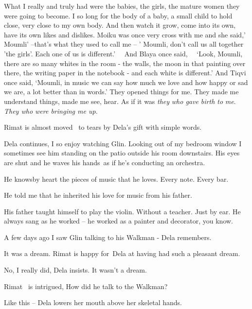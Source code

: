 \documentclass[letterpaper]{article}
\begin{document}
{\textquotedbl}What I really and truly had were the babies, the girls, the mature women they were going to become. I so
long for the body of a baby, a small child to hold close, very close to my own body. And then watch it grow, come into
its own, have its own likes and dislikes. Moiku was once very cross with me and she said,' Moumli' --that's what they
used to call me -- ' Moumli, don't call us all together 'the girls'. Each one of us is different.' \ \ And Blaya once
said, \ \ {}`Look, Moumli, there are so many whites in the room - the walls, the moon in that painting over there, the
writing paper in the notebook - and each white is different.' And Tiqvi once said, `Moumli, in music we can say how
much we love and how happy or sad we are, a lot better than in words.' They opened things for me. They made me
understand things, made me see, hear. As if it was \textit{they} \textit{who gave birth to} \textit{me}.\textit{ They
who were bringing me up.}{\textquotedbl}

Rimat is almost moved \ to tears by Dela's gift with simple words.

Dela continues, {\textquotedbl}I so enjoy watching Glin. Looking out of my bedroom window I sometimes see him standing
on the patio outside his room downstairs. His eyes are shut and he waves his hands~as if he's conducting an
orchestra.{\textquotedbl} 

{\textquotedbl}He knowsby heart the pieces of music that he loves. Every note. Every bar.{\textquotedbl}

{\textquotedbl}He told me that he inherited his love for music from his father.{\textquotedbl}

{\textquotedbl}His father taught himself to play the violin. Without a teacher. Just by ear. He always sang as he worked
-- he worked as a painter and decorator, you know.{\textquotedbl}

{\textquotedbl}A few days ago I saw Glin talking to his Walkman -{\textquotedbl} Dela remembers. 

{\textquotedbl}It was a dream.{\textquotedbl} Rimat is happy for~Dela at having had such a pleasant dream.

{\textquotedbl}No, I really did,{\textquotedbl} Dela insists. {\textquotedbl}It wasn't a dream.{\textquotedbl}

Rimat ~is intrigued, {\textquotedbl}How did he talk to the Walkman?{\textquotedbl}

{\textquotedbl}Like this --{\textquotedbl} Dela lowers her mouth above her skeletal hands. 
\end{document}
